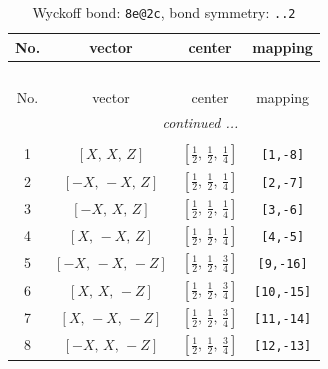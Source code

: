 \documentclass[fleqn,8pt]{jsarticle}
\begin{document}
\begin{longtable}{cccc}
\caption{Wyckoff bond: {\tt 8e@2c}, bond symmetry: {\tt ..2}}
 \\
 \hline \hline
No. & vector & center & mapping \\ \hline \endfirsthead

\multicolumn{3}{l}{\tablename\ \thetable{}} \\
 \hline \hline
No. & vector & center & mapping \\ \hline \endhead

 \hline \hline
\multicolumn{3}{r}{\footnotesize\it continued ...} \\ \endfoot

 \hline \hline
\multicolumn{3}{r}{} \\ \endlastfoot

1 & $\left[ X,\, X,\, Z \right]$ & $\left[ \frac{1}{2},\, \frac{1}{2},\, \frac{1}{4} \right]$ & {\tt [1,-8]} \\ \hline
2 & $\left[ - X,\, - X,\, Z \right]$ & $\left[ \frac{1}{2},\, \frac{1}{2},\, \frac{1}{4} \right]$ & {\tt [2,-7]} \\ \hline
3 & $\left[ - X,\, X,\, Z \right]$ & $\left[ \frac{1}{2},\, \frac{1}{2},\, \frac{1}{4} \right]$ & {\tt [3,-6]} \\ \hline
4 & $\left[ X,\, - X,\, Z \right]$ & $\left[ \frac{1}{2},\, \frac{1}{2},\, \frac{1}{4} \right]$ & {\tt [4,-5]} \\ \hline
5 & $\left[ - X,\, - X,\, - Z \right]$ & $\left[ \frac{1}{2},\, \frac{1}{2},\, \frac{3}{4} \right]$ & {\tt [9,-16]} \\ \hline
6 & $\left[ X,\, X,\, - Z \right]$ & $\left[ \frac{1}{2},\, \frac{1}{2},\, \frac{3}{4} \right]$ & {\tt [10,-15]} \\ \hline
7 & $\left[ X,\, - X,\, - Z \right]$ & $\left[ \frac{1}{2},\, \frac{1}{2},\, \frac{3}{4} \right]$ & {\tt [11,-14]} \\ \hline
8 & $\left[ - X,\, X,\, - Z \right]$ & $\left[ \frac{1}{2},\, \frac{1}{2},\, \frac{3}{4} \right]$ & {\tt [12,-13]} \\
\end{longtable}
\renewcommand{\arraystretch}{1.2}
\end{document}
